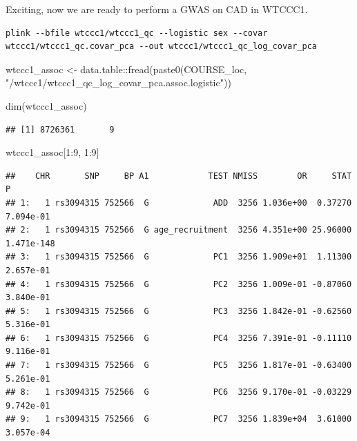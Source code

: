 \documentclass[
]{book}
\newenvironment{Shaded}{\begin{snugshade}}{\end{snugshade}}
\newcommand{\DecValTok}[1]{\textcolor[rgb]{0.00,0.00,0.81}{#1}}
\newcommand{\FunctionTok}[1]{\textcolor[rgb]{0.00,0.00,0.00}{#1}}
\newcommand{\NormalTok}[1]{#1}
\newcommand{\OtherTok}[1]{\textcolor[rgb]{0.56,0.35,0.01}{#1}}
\newcommand{\SpecialCharTok}[1]{\textcolor[rgb]{0.00,0.00,0.00}{#1}}
\newcommand{\StringTok}[1]{\textcolor[rgb]{0.31,0.60,0.02}{#1}}
\begin{document}
Exciting, now we are ready to perform a GWAS on CAD in WTCCC1.

\begin{verbatim}
plink --bfile wtccc1/wtccc1_qc --logistic sex --covar wtccc1/wtccc1_qc.covar_pca --out wtccc1/wtccc1_qc_log_covar_pca
\end{verbatim}

\begin{Shaded}
\begin{Highlighting}[]
\NormalTok{wtccc1\_assoc }\OtherTok{\textless{}{-}}\NormalTok{ data.table}\SpecialCharTok{::}\FunctionTok{fread}\NormalTok{(}\FunctionTok{paste0}\NormalTok{(COURSE\_loc, }\StringTok{"/wtccc1/wtccc1\_qc\_log\_covar\_pca.assoc.logistic"}\NormalTok{))}

\FunctionTok{dim}\NormalTok{(wtccc1\_assoc)}
\end{Highlighting}
\end{Shaded}

\begin{verbatim}
## [1] 8726361       9
\end{verbatim}

\begin{Shaded}
\begin{Highlighting}[]
\NormalTok{wtccc1\_assoc[}\DecValTok{1}\SpecialCharTok{:}\DecValTok{9}\NormalTok{, }\DecValTok{1}\SpecialCharTok{:}\DecValTok{9}\NormalTok{]}
\end{Highlighting}
\end{Shaded}

\begin{verbatim}
##    CHR       SNP     BP A1            TEST NMISS        OR     STAT          P
## 1:   1 rs3094315 752566  G             ADD  3256 1.036e+00  0.37270  7.094e-01
## 2:   1 rs3094315 752566  G age_recruitment  3256 4.351e+00 25.96000 1.471e-148
## 3:   1 rs3094315 752566  G             PC1  3256 1.909e+01  1.11300  2.657e-01
## 4:   1 rs3094315 752566  G             PC2  3256 1.009e-01 -0.87060  3.840e-01
## 5:   1 rs3094315 752566  G             PC3  3256 1.842e-01 -0.62560  5.316e-01
## 6:   1 rs3094315 752566  G             PC4  3256 7.391e-01 -0.11110  9.116e-01
## 7:   1 rs3094315 752566  G             PC5  3256 1.817e-01 -0.63400  5.261e-01
## 8:   1 rs3094315 752566  G             PC6  3256 9.170e-01 -0.03229  9.742e-01
## 9:   1 rs3094315 752566  G             PC7  3256 1.839e+04  3.61000  3.057e-04
\end{verbatim}
\end{document}
